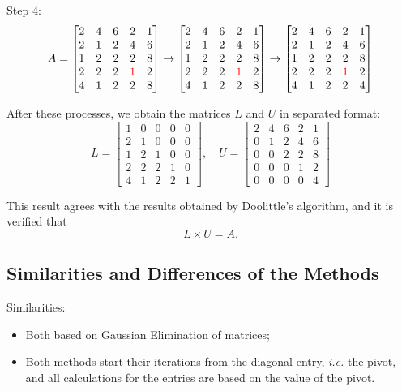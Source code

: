 \documentclass[a4paper,titlepage]{article}
\begin{document}
			Step 4:
			$$
				A = \begin{bmatrix}				
					2 & 4 & 6 & 2 & 1\\
					2 & 1 & 2 & 4 & 6\\
					1 & 2 & 2 & 2 & 8\\
					2 & 2 & 2 & \textcolor{red}{1} & 2\\
					4 & 1 & 2 & 2 & 8
				\end{bmatrix} \rightarrow \begin{bmatrix}				
					2 & 4 & 6 & 2 & 1\\
					2 & 1 & 2 & 4 & 6\\
					1 & 2 & 2 & 2 & 8\\
					2 & 2 & 2 & \textcolor{red}{1} & 2\\
					4 & 1 & 2 & 2 & 8
				\end{bmatrix} \rightarrow \begin{bmatrix}				
					2 & 4 & 6 & 2 & 1\\
					2 & 1 & 2 & 4 & 6\\
					1 & 2 & 2 & 2 & 8\\
					2 & 2 & 2 & \textcolor{red}{1} & 2\\
					4 & 1 & 2 & 2 & 4
				\end{bmatrix}
			$$
			
			After these processes, we obtain the matrices $L$ and $U$ in separated format:
			$$
			L = \begin{bmatrix}
			1 & 0 & 0 & 0 & 0\\
			2 & 1 & 0 & 0 & 0\\
			1 & 2 & 1 & 0 & 0\\
			2 & 2 & 2 & 1 & 0\\
			4 & 1 & 2 & 2 & 1
			\end{bmatrix}, \quad		
			U = \begin{bmatrix}
			2 & 4 & 6 & 2 & 1\\
			0 & 1 & 2 & 4 & 6\\
			0 & 0 & 2 & 2 & 8\\
			0 & 0 & 0 & 1 & 2\\
			0 & 0 & 0 & 0 & 4
			\end{bmatrix}		
			$$
			
			This result agrees with the results obtained by Doolittle's algorithm, and it is verified that 
			$$
				L\times U = A.
			$$
		\subsection{Similarities and Differences of the Methods}
			Similarities:
			\begin{itemize}
				\item Both based on Gaussian Elimination of matrices; 
				\item Both methods start their iterations from the diagonal entry, \textit{i.e.} the pivot, and all calculations for the entries are based on the value of the pivot.
			\end{itemize}
		
\end{document}
